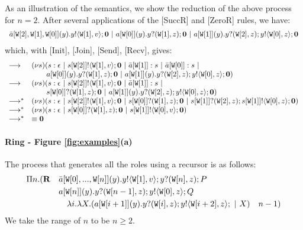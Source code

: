 \documentclass{LMCS}
\newcommand{\sr}[4]{\ensuremath{\bar{#1}[#2](#3).#4}}
\newcommand{\ssa}[4]{\ensuremath{#1[#2](#3).#4}}
\newcommand{\si}[2]{\ensuremath{#1[#2]}}
\newcommand{\sj}[3]{\ensuremath{\bar{#1}[#2]:#3}}
\newcommand{\pc}{\Par}
\newcommand{\s}{\ensuremath{s}}
\newcommand{\X}{\ensuremath{X}}
\newcommand{\inact}{\ensuremath{\mathbf{0}}}
\newcommand{\Par}{\ensuremath{\ |\ }}
\newcommand{\redsym}{\ensuremath{\longrightarrow}}
\newcommand{\red}[2]{\ensuremath{#1\redsym#2}}
\newcommand{\qbot}{\ensuremath{\epsilon}}
\newcommand{\outS}[3]{\ensuremath{#1!\langle #2\rangle;#3}}
\newcommand{\inpS}[3]{\ensuremath{#1?( #2);#3}}
\newcommand{\y}{\ensuremath{y}}
\newcommand{\Ia}{\ensuremath{a}}
\newcommand{\ii}{\ensuremath{i}}
\newcommand{\nn}{\ensuremath{n}}
\newcommand{\W}{\ensuremath{\mathtt{W}}}
\begin{document}
As an illustration of the semantics, we show the reduction of the above process
for $n=2$. After several applications of the [SuccR] and [ZeroR] rules, we have:
{\small
\[
\begin{array}{l}
\sr{a}{\W[2],\W[1],\W[0]}{y}{\outS{\y}{\W[1],v}}\inact \pc
\ssa{a}{\W[0]}{y}{\inpS{y}{\W[1],z}}\inact \pc
\ssa{a}{\W[1]}{y}{\inpS{y}{\W[2],z}\outS{\y}{\W[0],z}}\inact
\end{array}
\]
} which, with [Init], [Join], [Send], [Recv], gives:
{\small
\[
\begin{array}{ll}
\red{}{} &(\nu \s)(s : \qbot \pc \outS{\si\s {\W[2]}}{\W[1],v}\inact \pc \sj{\Ia}{\W[1]}{\s}\pc \sj{\Ia}{\W[0]}{\s}\pc \\
 & \qquad
\ssa{a}{\W[0]}{y}{\inpS{y}{\W[1],z}}\inact \pc \ssa{a}{\W[1]}{y}{\inpS{y}{\W[2],z}\outS{\y}{\W[0],z}}\inact)\\
\red{}{} & (\nu \s)(s : \qbot \pc \outS{\si\s {\W[2]}}{\W[1],v}\inact \pc \sj{\Ia}{\W[1]}{\s}\pc\\
 &  \qquad \inpS{\si\s {\W[0]}}{\W[1],z}\inact \pc
\ssa{a}{\W[1]}{y}{\inpS{y}{\W[2],z}\outS{\y}{\W[0],z}}\inact)\\
\red{}{}^* & (\nu \s)(s : \qbot \pc \outS{\si\s {\W[2]}}{\W[1],v}\inact \pc \inpS{\si\s {\W[0]}}{\W[1],z}\inact \pc
\inpS{\si\s {\W[1]}}{\W[2],z}\outS{\si\s {\W[1]}}{\W[0],z}\inact)\\
\red{}{}^* &
(\nu \s)(s :  \qbot \pc \inpS{\si\s {\W[0]}}{\W[1],z}\inact \pc
\outS{\si\s {\W[1]}}{\W[0],v}\inact) \\
\red{}{}^* & \equiv \inact
\end{array}
\]
}




\paragraph{\bf Ring - Figure \ref{fig:examples}(a)}
The process that generates all the
roles using a recursor is as follows:
{\small
\[
\begin{array}{lllll}
\Pi \nn.(\mathbf{R} &
\sr{a}{\W[0], ..., \W[\nn]}{y}{\outS{\y}{\W[1],v}\inpS{y}{\W[\nn],z}P}\\[1mm]
& \ssa{a}{\W[\nn]}{y}{\inpS{y}{\W[\nn-1],z}{\outS{\y}{\W[0],z}Q}}\\[1mm]
& \quad \lambda {\ii}.\lambda{\X}.(
\ssa{a}{\W[\ii+1]}{y}{\inpS{y}{\W[\ii],z}\outS{\y}{\W[\ii+2],z} \pc X}) {\quad \nn-1} )
\end{array}
\]
}
We take the range of $\nn$ to be $\nn\geq 2$.
\end{document}
